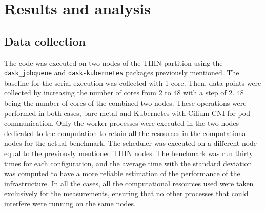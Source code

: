 \section{Results and analysis}\label{sec:daskresults}
\subsection{Data collection}\label{sec:daskresults}




The code was executed on two nodes of the THIN partition using the
\texttt{dask\_jobqueue} and \texttt{dask-kubernetes} packages previously
mentioned. The baseline for the serial execution was collected with 1 core.
Then, data points were collected by increasing the number of cores from 2 to 48
with a step of 2. 48 being the number of cores of the combined two nodes. These
operations were performed in both cases, bare metal and Kubernetes with Cilium
CNI for pod communication. Only the worker processes were executed in the two
nodes dedicated to the computation to retain all the resources in the
computational nodes for the actual benchmark. The scheduler was executed on a
different node equal to the previously mentioned THIN nodes. The benchmark was
run thirty times for each configuration, and the average time with the standard
deviation was computed to have a more reliable estimation of the performance of
the infrastructure. In all the cases, all the computational resources used were
taken exclusively for the measurements, ensuring that no other processes that
could interfere were running on the same nodes.

